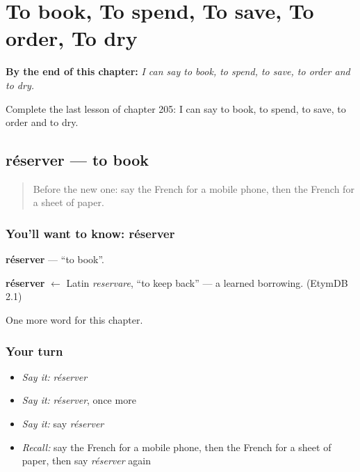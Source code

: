 
\chapter{To book, To spend, To save, To order, To dry}
\label{ch:fr-to-book-to-spend-to-save-to-order-to-dry}

\begin{chapteropening}
\textbf{By the end of this chapter:} \emph{I can say to book, to spend, to save, to order and to dry.}

Complete the last lesson of chapter 205: I can say to book, to spend, to save, to order and to dry.
\end{chapteropening}

\section[réserver]{réserver — to book}

\label{lesson:FR-C205-reserver}



\begin{quote}
Before the new one: say the French for a mobile phone, then the French for a sheet of paper.
\end{quote}

\subsection*{You'll want to know: réserver}
\textbf{réserver} — \textquotedblleft{}to book\textquotedblright{}.

\begin{cousinweb}
\textbf{réserver} $\leftarrow$ Latin \emph{reservare}, \textquotedblleft{}to keep back\textquotedblright{} — a learned borrowing. (EtymDB 2.1)
\end{cousinweb}

\begin{grammarlens}[title={What you've built}]
One more word for this chapter.
\end{grammarlens}

\subsection*{Your turn}
\begin{itemize}
\raggedright
  \item \emph{Say it:} \emph{réserver}
  \item \emph{Say it:} \emph{réserver}, once more
  \item \emph{Say it:} say \emph{réserver}
  \item \emph{Recall:} say the French for a mobile phone, then the French for a sheet of paper, then say \emph{réserver} again
\end{itemize}


